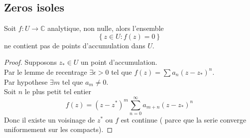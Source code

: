 \documentclass[../main.tex]{subfiles}
\begin{document}
\subsection{Zeros isoles}
\begin{propo}
Soit $f:U \to \mathbb{C}$ analytique, non nulle, alors l'ensemble
\[ 
	\left\{ z\in U: f( z) =0 \right\} 
\]
ne contient pas de points d'accumulation dans $U$.
\end{propo}
\begin{proof}
Supposons $z_{\ast} \in U$ un point d'accumulation.\\
Par le lemme de recentrage $\exists \epsilon>0$ tel que $f( z) = \sum a_n ( z-z_{\ast} ) ^{n}$.\\
Par hypothese $\exists m$ tel que $a_m\neq 0$.\\
Soit $n$ le plus petit tel entier
\[ 
	f( z) = ( z-z^{*}) ^{m} \sum_{n=0} ^{ \infty } a_{m+n} ( z-z_{\ast} ) ^{n}		
\]
Donc il existe un voisinage de $z^{*}$ ou $f$ est continue ( parce que la serie converge uniformement sur les compacts).

\end{proof}

		

				
	
\end{document}
